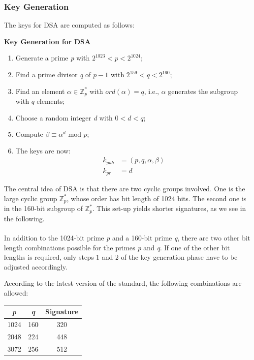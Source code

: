 \documentclass[11pt, a4paper]{article}
\newcommand{\mymod}{
    \text{ mod }
}
\begin{document}
\subsubsection*{Key Generation}
The keys for DSA are computed as follows:
\begin{framed}
    \hfill\break\textbf{Key Generation for DSA}
    \begin{enumerate}
        \item Generate a prime \textit{p} with $2^{1023}<p<2^{1024}$;
        \item Find a prime divisor \textit{q} of $p-1$ with $2^{159}<q<2^{160}$;
        \item Find an element $\alpha\in\mathbb{Z}^*_p$ with $ord(\alpha)=q$, i.e., $\alpha$ generates the subgroup with $q$ elements;
        \item Choose a random integer \textit{d} with $0<d<q$;
        \item Compute $\beta\equiv\alpha^d\mymod p$;
        \item The keys are now:
        \begin{align*}
            k_{pub}&=(p,q,\alpha,\beta)\\
            k_{pr}&=d
        \end{align*}
    \end{enumerate}
\end{framed}
The central idea of DSA is that there are two cyclic groups involved. One is the large cyclic group $\mathbb{Z}_p^*$, whose order has bit length of 1024 bits. The second one is in the 160-bit subgroup of $\mathbb{Z}_p^*$. This set-up yields shorter signatures, as we see in the following.\\\\
In addition to the 1024-bit prime \textit{p} and a 160-bit prime \textit{q}, there are two other bit length combinations possible for the primes \textit{p} and \textit{q}. If one of the other bit lengths is required, only steps 1 and 2 of the key generation phase have to be adjusted accordingly.

\newpage
\hfill\break
According to the latest version of the standard, the following combinations are allowed:
\begin{center}
    \begin{tabular}{|c|c|c|}
        \hline
        \textit{p}&\textit{q}&Signature\\
        \hline
        1024&160&320\\
        2048&224&448\\
        3072&256&512\\
        \hline
    \end{tabular}
\end{center}
\end{document}
